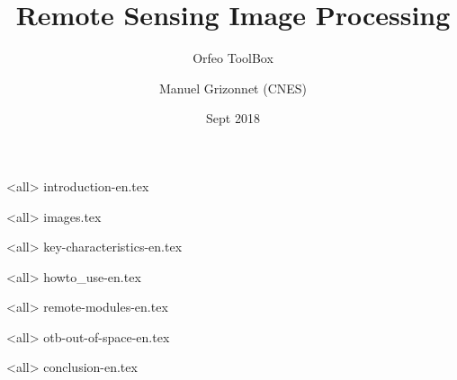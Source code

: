 \documentclass[8pt]{beamer}
\title{Remote Sensing Image Processing}
\subtitle{Orfeo ToolBox}
\author{Manuel Grizonnet (CNES)}
\date{Sept 2018}
\begin{document}
\begin{frame}
\titlepage
\end{frame}

\mode<all>
{introduction-en.tex}

\mode<all>
{images.tex}

\mode<all>
{key-characteristics-en.tex}

\mode<all>
{howto_use-en.tex}


\mode<all>
{remote-modules-en.tex}

\mode<all>
{otb-out-of-space-en.tex}

\mode<all>
{conclusion-en.tex}
\end{document}
